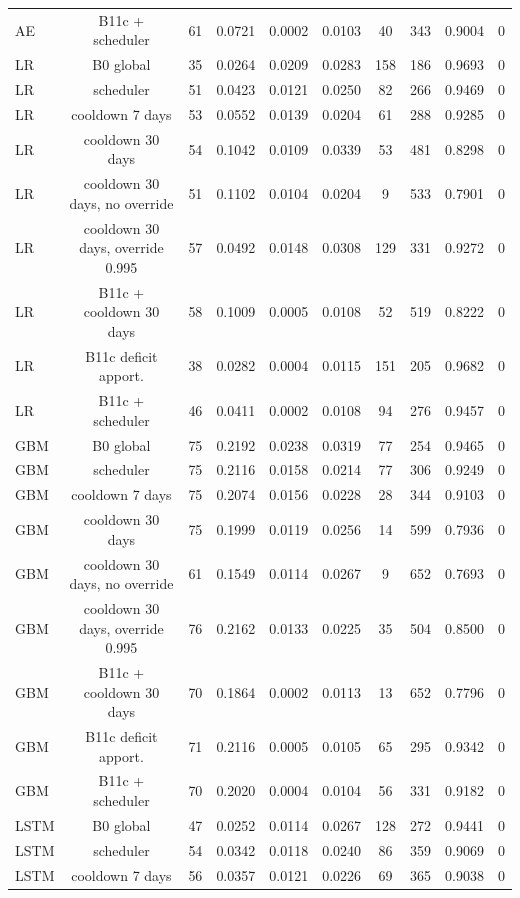 \documentclass[10pt,onecolumn,letterpaper]{article}
\begin{document}
\begin{table}[!t]
{\begin{tabular}{lccccccccc}
AE & B11c + scheduler & 61 & 0.0721 & 0.0002 & 0.0103 & 40 & 343 & 0.9004 & 0 \\
LR & B0 global & 35 & 0.0264 & 0.0209 & 0.0283 & 158 & 186 & 0.9693 & 0 \\
LR & scheduler & 51 & 0.0423 & 0.0121 & 0.0250 & 82 & 266 & 0.9469 & 0 \\
LR & cooldown 7 days & 53 & 0.0552 & 0.0139 & 0.0204 & 61 & 288 & 0.9285 & 0 \\
LR & cooldown 30 days & 54 & 0.1042 & 0.0109 & 0.0339 & 53 & 481 & 0.8298 & 0 \\
LR & cooldown 30 days, no override & 51 & 0.1102 & 0.0104 & 0.0204 & 9 & 533 & 0.7901 & 0 \\
LR & cooldown 30 days, override 0.995 & 57 & 0.0492 & 0.0148 & 0.0308 & 129 & 331 & 0.9272 & 0 \\
LR & B11c + cooldown 30 days & 58 & 0.1009 & 0.0005 & 0.0108 & 52 & 519 & 0.8222 & 0 \\
LR & B11c deficit apport. & 38 & 0.0282 & 0.0004 & 0.0115 & 151 & 205 & 0.9682 & 0 \\
LR & B11c + scheduler & 46 & 0.0411 & 0.0002 & 0.0108 & 94 & 276 & 0.9457 & 0 \\
GBM & B0 global & 75 & 0.2192 & 0.0238 & 0.0319 & 77 & 254 & 0.9465 & 0 \\
GBM & scheduler & 75 & 0.2116 & 0.0158 & 0.0214 & 77 & 306 & 0.9249 & 0 \\
GBM & cooldown 7 days & 75 & 0.2074 & 0.0156 & 0.0228 & 28 & 344 & 0.9103 & 0 \\
GBM & cooldown 30 days & 75 & 0.1999 & 0.0119 & 0.0256 & 14 & 599 & 0.7936 & 0 \\
GBM & cooldown 30 days, no override & 61 & 0.1549 & 0.0114 & 0.0267 & 9 & 652 & 0.7693 & 0 \\
GBM & cooldown 30 days, override 0.995 & 76 & 0.2162 & 0.0133 & 0.0225 & 35 & 504 & 0.8500 & 0 \\
GBM & B11c + cooldown 30 days & 70 & 0.1864 & 0.0002 & 0.0113 & 13 & 652 & 0.7796 & 0 \\
GBM & B11c deficit apport. & 71 & 0.2116 & 0.0005 & 0.0105 & 65 & 295 & 0.9342 & 0 \\
GBM & B11c + scheduler & 70 & 0.2020 & 0.0004 & 0.0104 & 56 & 331 & 0.9182 & 0 \\
LSTM & B0 global & 47 & 0.0252 & 0.0114 & 0.0267 & 128 & 272 & 0.9441 & 0 \\
LSTM & scheduler & 54 & 0.0342 & 0.0118 & 0.0240 & 86 & 359 & 0.9069 & 0 \\
LSTM & cooldown 7 days & 56 & 0.0357 & 0.0121 & 0.0226 & 69 & 365 & 0.9038 & 0 \\

\end{tabular}}
\end{table}
\end{document}
